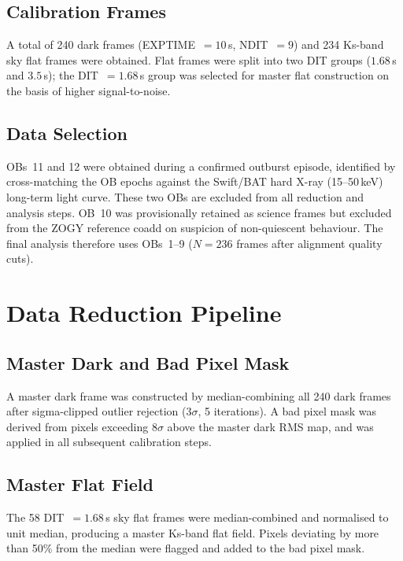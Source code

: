 \documentclass[12pt,a4paper]{article}
\begin{document}
\subsection{Calibration Frames}

A total of 240 dark frames (EXPTIME~$= 10$\,s, NDIT~$= 9$) and 234 Ks-band
sky flat frames were obtained. Flat frames were split into two DIT groups
($1.68$\,s and $3.5$\,s); the DIT~$= 1.68$\,s group was selected for master
flat construction on the basis of higher signal-to-noise.

\subsection{Data Selection}
\label{sec:data_selection}

OBs~11 and 12 were obtained during a confirmed outburst episode, identified by
cross-matching the OB epochs against the Swift/BAT hard X-ray (15--50\,keV)
long-term light curve. These two OBs are excluded from all reduction and
analysis steps. OB~10 was provisionally retained as science frames but excluded
from the ZOGY reference coadd on suspicion of non-quiescent behaviour. The
final analysis therefore uses OBs~1--9 ($N = 236$ frames after alignment
quality cuts).

\section{Data Reduction Pipeline}
\label{sec:reduction}

\subsection{Master Dark and Bad Pixel Mask}

A master dark frame was constructed by median-combining all 240 dark frames
after sigma-clipped outlier rejection ($3\sigma$, 5 iterations). A bad pixel
mask was derived from pixels exceeding $8\sigma$ above the master dark RMS map,
and was applied in all subsequent calibration steps.

\subsection{Master Flat Field}

The 58 DIT~$= 1.68$\,s sky flat frames were median-combined and normalised to
unit median, producing a master Ks-band flat field. Pixels deviating by more
than 50\% from the median were flagged and added to the bad pixel mask.
\end{document}
